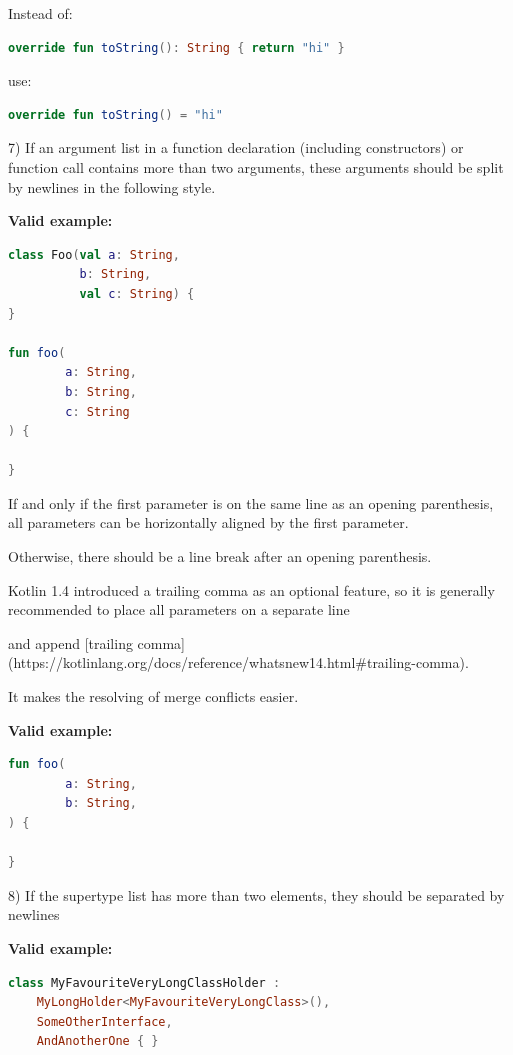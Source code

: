{{Instead of:

\begin{lstlisting}[language=Kotlin]
override fun toString(): String { return "hi" }
\end{lstlisting}
use:

\begin{lstlisting}[language=Kotlin]
override fun toString() = "hi"
\end{lstlisting}


7)  If an argument list in a function declaration (including constructors) or function call contains more than two arguments, these arguments should be split by newlines in the following style.



\textbf{Valid example:}

\begin{lstlisting}[language=Kotlin]
class Foo(val a: String,
          b: String,
          val c: String) {
}

fun foo(
        a: String,
        b: String,
        c: String
) {

}
\end{lstlisting}


If and only if the first parameter is on the same line as an opening parenthesis, all parameters can be horizontally aligned by the first parameter.

Otherwise, there should be a line break after an opening parenthesis.



Kotlin 1.4 introduced a trailing comma as an optional feature, so it is generally recommended to place all parameters on a separate line

and append [trailing comma](https://kotlinlang.org/docs/reference/whatsnew14.html\#trailing-comma).

It makes the resolving of merge conflicts easier.



\textbf{Valid example:}

\begin{lstlisting}[language=Kotlin]
fun foo(
        a: String,
        b: String,
) {

}
\end{lstlisting}


8) If the supertype list has more than two elements, they should be separated by newlines



\textbf{Valid example:}

\begin{lstlisting}[language=Kotlin]
class MyFavouriteVeryLongClassHolder :
    MyLongHolder<MyFavouriteVeryLongClass>(),
    SomeOtherInterface,
    AndAnotherOne { }
\end{lstlisting}


}}
